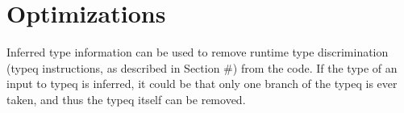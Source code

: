 \section{Optimizations}

Inferred type information can be used to remove runtime type discrimination (typeq instructions, as described in Section #) from the code. If the type of an input to typeq is inferred, it could be that only one branch of the typeq is ever taken, and thus the typeq itself can be removed.
